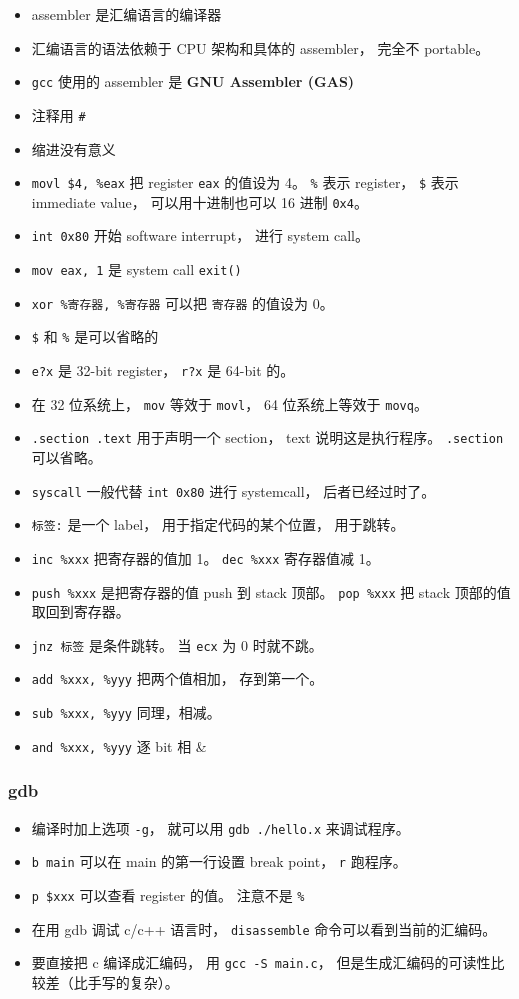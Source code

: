 \begin{itemize}
\item assembler 是汇编语言的编译器
\item 汇编语言的语法依赖于 CPU 架构和具体的 assembler， 完全不 portable。
\item \verb|gcc| 使用的 assembler 是 \textbf{GNU Assembler (GAS)}
\item 注释用 \verb|#|
\item 缩进没有意义
\item \verb|movl $4, %eax| 把 register \verb|eax| 的值设为 4。 \verb|%| 表示 register， \verb|$| 表示 immediate value， 可以用十进制也可以 16 进制 \verb|0x4|。
\item \verb|int 0x80| 开始 software interrupt， 进行 system call。
\item \verb|mov eax, 1| 是 system call \verb|exit()|
\item \verb|xor %寄存器, %寄存器| 可以把 \verb|寄存器| 的值设为 0。
\item \verb|$| 和 \verb|%| 是可以省略的
\item \verb|e?x| 是 32-bit register， \verb|r?x| 是 64-bit 的。
\item 在 32 位系统上， \verb|mov| 等效于 \verb|movl|， 64 位系统上等效于 \verb|movq|。
\item \verb|.section .text| 用于声明一个 section， text 说明这是执行程序。 \verb|.section| 可以省略。
\item \verb|syscall| 一般代替 \verb|int 0x80| 进行 systemcall， 后者已经过时了。
\item \verb|标签:| 是一个 label， 用于指定代码的某个位置， 用于跳转。
\item \verb|inc %xxx| 把寄存器的值加 1。 \verb|dec %xxx| 寄存器值减 1。
\item \verb|push %xxx| 是把寄存器的值 push 到 stack 顶部。 \verb|pop %xxx| 把 stack 顶部的值取回到寄存器。
\item \verb|jnz 标签| 是条件跳转。 当 \verb|ecx| 为 0 时就不跳。
\item \verb|add %xxx, %yyy| 把两个值相加， 存到第一个。
\item \verb|sub %xxx, %yyy| 同理，相减。
\item \verb|and %xxx, %yyy| 逐 bit 相 \&
\end{itemize}

\subsubsection{gdb}
\begin{itemize}
\item 编译时加上选项 \verb|-g|， 就可以用 \verb|gdb ./hello.x| 来调试程序。
\item \verb|b main| 可以在 main 的第一行设置 break point， \verb|r| 跑程序。
\item \verb|p $xxx| 可以查看 register 的值。 注意不是 \verb|%|
\item 在用 gdb 调试 c/c++ 语言时， \verb|disassemble| 命令可以看到当前的汇编码。
\item 要直接把 c 编译成汇编码， 用 \verb|gcc -S main.c|， 但是生成汇编码的可读性比较差（比手写的复杂）。
\end{itemize}

